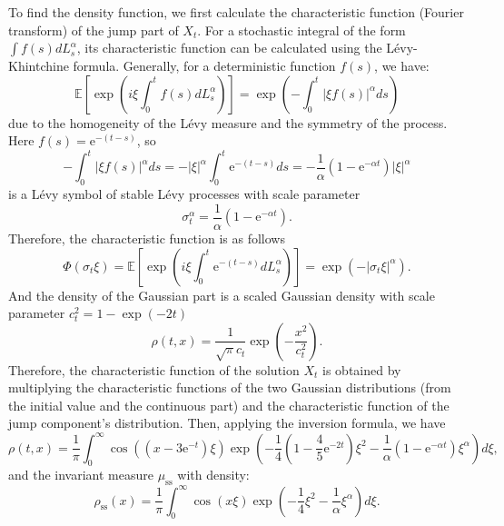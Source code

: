 \documentclass[10pt]{article}
\theoremstyle{definition}
\numberwithin{equation}{section}
\begin{document}
To find the density function, we first calculate the characteristic function (Fourier transform) of the jump part of $X_t$. For a stochastic integral of the form $\int f(s) dL^{\alpha}_s$,  its characteristic function can be calculated using the L\'{e}vy-Khintchine formula. Generally, for a deterministic function $f(s)$, we have:
\begin{equation*}
    \mathbb{E}\left[ \exp\left( i\xi\int_0^t f(s)dL^{\alpha}_s \right) \right] =  \exp\left( -\int_0^t |\xi f(s)|^{\alpha}ds \right)
\end{equation*}
due to the homogeneity of the L\'{e}vy measure and the symmetry of the process. Here $f(s) = \mathrm{e}^{-(t-s)}$, so
\begin{equation*}
    -\int_0^t |\xi f(s)|^{\alpha}ds = -|\xi|^\alpha\int_0^t \mathrm{e}^{-(t-s)}ds =- \frac{1}{\alpha}(1-\mathrm{e}^{-\alpha t})|\xi|^\alpha
\end{equation*}
is a L\'{e}vy symbol of stable L\'{e}vy processes with scale parameter
\begin{equation*}
    \sigma_t^\alpha = \frac{1}{\alpha}(1-\mathrm{e}^{-\alpha t}).
\end{equation*}
Therefore, the characteristic function is as follows
\begin{equation*}
    \Phi(\sigma_t\xi) = \mathbb{E}\left[ \exp\left( i\xi\int_0^t \mathrm{e}^{-(t-s)}dL^{\alpha}_s \right) \right] = \exp(-|\sigma_t\xi|^\alpha ).
\end{equation*}
And the density of the Gaussian part is a scaled Gaussian density with scale parameter $c^2_t=1-\exp(-2t)$
\begin{equation*}
    \rho(t,x) = \frac{1}{\sqrt{\pi}c_t}\exp\left( -\frac{x^2}{c^2_t} \right).
\end{equation*}
Therefore, the characteristic function of the solution $X_t$ is obtained by multiplying the characteristic functions of the two Gaussian distributions (from the initial value and the continuous part) and the characteristic function of the jump component's distribution. Then, applying the inversion formula, we have
\begin{equation*}
    \rho(t,x) =  \frac{1}{\pi}\int_0^\infty \cos((x-3\mathrm{e}^{-t})\xi) \exp \left( -\frac{1}{4}( 1 - \frac{4}{5}\mathrm{e}^{-2t} )\xi^2 -\frac{1}{\alpha}(1-\mathrm{e}^{-\alpha t})\xi^\alpha\right) d\xi,
\end{equation*}
and the invariant measure $\mu_\mathrm{ss}$ with density:
\begin{equation}
    \rho_\mathrm{ss}(x)  = \frac{1}{\pi}\int_0^\infty \cos(x\xi) \exp \left( - \frac{1}{4}\xi^2 -\frac{1}{\alpha}\xi^\alpha\right) d\xi .
\end{equation}
\end{document}
